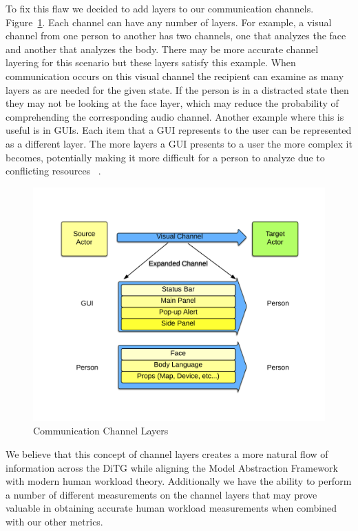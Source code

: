 To fix this flaw we decided to add layers to our communication channels. Figure~\ref{fig:layers}.  Each channel can have any number of layers.  For example, a visual channel from one person to another has two channels, one that analyzes the face and another that analyzes the body.  There may be more accurate channel layering for this scenario but these layers satisfy this example.  When communication occurs on this visual channel the recipient can examine as many layers as are needed for the given state.  If the person is in a distracted state then they may not be looking at the face layer, which may reduce the probability of comprehending the corresponding audio channel.  Another example where this is useful is in GUIs.  Each item that a GUI represents to the user can be represented as a different layer.  The more layers a GUI presents to a user the more complex it becomes, potentially making it more difficult for a person to analyze due to conflicting resources ~\cite{salvucci2008threaded}.

\begin{figure}[h]
\begin{center}
\includegraphics[width=6in]{layers.png}
\caption{Communication Channel Layers}
\label{fig:layers}
\end{center}
\end{figure}

We believe that this concept of channel layers creates a more natural flow of information across the DiTG while aligning the Model Abstraction Framework with modern human workload theory.  Additionally we have the ability to perform a number of different measurements on the channel layers that may prove valuable in obtaining accurate human workload measurements when combined with our other metrics.

